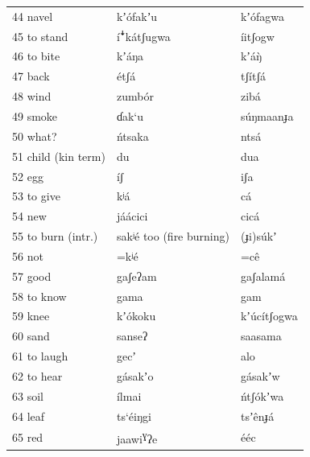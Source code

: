 \documentclass[output=paper]{langsci/langscibook}
\begin{document}
\begin{longtable}{p{}  p{} p{}}
44 navel & kʼ\'{o}fakʼu & kʼ\'{o}fagwa \\

45 to stand & \'{i}\textsf{ꜜ}k\'{a}tʃugwa & \'{i}itʃogw \\

46 to bite & kʼ\'{a}ŋa & kʼ\'{a}ŋ̀ \\

47 back & \'{e}tʃ\'{a} & tʃ\'{i}tʃ\'{a}  \\ 

48 wind & zumb\'{o}r & zib\'{a} \\

49 smoke & ɗak‘u & s\'{u}ŋmaanɟa\\

50 what? & \'{n}tsaka & nts\'{a} \\

51 child (kin term) & du & dua \\

52 egg & \'{i}ʃ & iʃa \\

53 to give & kʲ\'{a} & c\'{a} \\

54 new & j\'{a}\'{a}cici & cic\'{a} \\

55 to burn (intr.) & sakʲ\'{e}  too  (fire burning) & (ɟi)s\'{u}kʼ \\

56 not & =kʲ\'{e} & =c\^{e} \\

57 good & gaʃeʔam & gaʃalam\'{a} \\

58 to know & gama & gam \\

59 knee & kʼ\'{o}koku & kʼ\'{u}c\'{i}tʃogwa \\

60 sand & sanseʔ & saasama \\

61 to laugh & gecʼ & alo \\

62 to hear & g\'{a}sakʼo & g\'{a}sakʼw \\

63 soil & \'{i}lmai & \'{n}tʃ\'{o}kʼwa \\

64 leaf & ts‘\'{e}iŋgi & tsʼ\^{e}nɟ\'{a} \\

65 red & jaawi\textsuperscript{ɣ}ʔe & \'{e}\'{e}c \\


\end{longtable}
\end{document}
